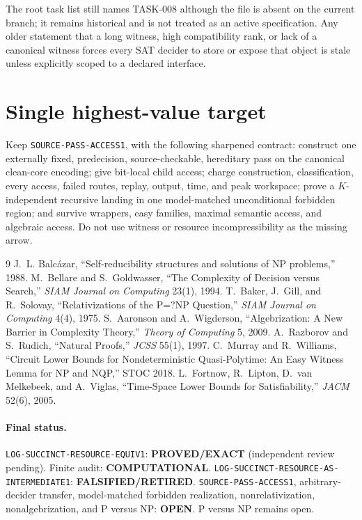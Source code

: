 \documentclass[11pt]{article}
\newcommand{\EXACT}{\textbf{PROVED/EXACT}}
\newcommand{\OPEN}{\textbf{OPEN}}
\newcommand{\RETIRED}{\textbf{FALSIFIED/RETIRED}}
\newcommand{\COMP}{\textbf{COMPUTATIONAL}}
\begin{document}
The root task list still names TASK-008 although the file is absent on the current branch; it remains historical and is not treated as an active specification.  Any older statement that a long witness, high compatibility rank, or lack of a canonical witness forces every SAT decider to store or expose that object is stale unless explicitly scoped to a declared interface.

\section{Single highest-value target}

Keep \texttt{SOURCE-PASS-ACCESS1}, with the following sharpened contract: construct one externally fixed, predecision, source-checkable, hereditary pass on the canonical clean-core encoding; give bit-local child access; charge construction, classification, every access, failed routes, replay, output, time, and peak workspace; prove a $K$-independent recursive landing in one model-matched unconditional forbidden region; and survive wrappers, easy families, maximal semantic access, and algebraic access.  Do not use witness or resource incompressibility as the missing arrow.

\begin{thebibliography}{9}
 J.~L. Balc\'azar, ``Self-reducibility structures and solutions of NP problems,'' 1988.
 M.~Bellare and S.~Goldwasser, ``The Complexity of Decision versus Search,'' \emph{SIAM Journal on Computing} 23(1), 1994.
 T.~Baker, J.~Gill, and R.~Solovay, ``Relativizations of the P=?NP Question,'' \emph{SIAM Journal on Computing} 4(4), 1975.
 S.~Aaronson and A.~Wigderson, ``Algebrization: A New Barrier in Complexity Theory,'' \emph{Theory of Computing} 5, 2009.
 A.~Razborov and S.~Rudich, ``Natural Proofs,'' \emph{JCSS} 55(1), 1997.
 C.~Murray and R.~Williams, ``Circuit Lower Bounds for Nondeterministic Quasi-Polytime: An Easy Witness Lemma for NP and NQP,'' STOC 2018.
 L.~Fortnow, R.~Lipton, D.~van Melkebeek, and A.~Viglas, ``Time-Space Lower Bounds for Satisfiability,'' \emph{JACM} 52(6), 2005.
\end{thebibliography}

\paragraph{Final status.}
\texttt{LOG-SUCCINCT-RESOURCE-EQUIV1}: \EXACT{} (independent review pending).  Finite audit: \COMP.  \texttt{LOG-SUCCINCT-RESOURCE-AS-INTERMEDIATE1}: \RETIRED.  \texttt{SOURCE-PASS-ACCESS1}, arbitrary-decider transfer, model-matched forbidden realization, nonrelativization, nonalgebrization, and P versus NP: \OPEN.  P versus NP remains open.

\end{document}
